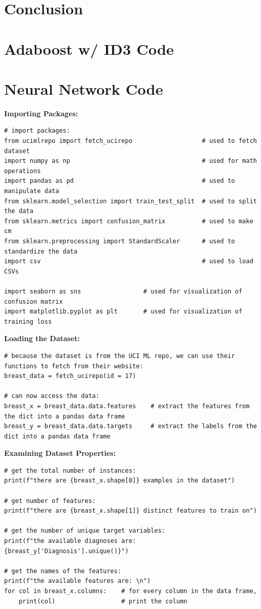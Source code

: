 \documentclass[a4paper]{article}
\begin{document}
\newpage
\section{Conclusion}

\newpage



\renewcommand{\thesection}{Appendix \Alph{section}: \hspace{-4mm}}
\setcounter{section}{0} %

\newpage
\section{Adaboost w/ ID3 Code}

\newpage
\section{Neural Network Code}
\textbf{Importing Packages:}
\begin{lstlisting}
# import packages:
from ucimlrepo import fetch_ucirepo                   # used to fetch dataset
import numpy as np                                    # used for math operations
import pandas as pd                                   # used to manipulate data
from sklearn.model_selection import train_test_split  # used to split the data
from sklearn.metrics import confusion_matrix          # used to make cm
from sklearn.preprocessing import StandardScaler      # used to standardize the data
import csv                                            # used to load CSVs

import seaborn as sns                 # used for visualization of confusion matrix
import matplotlib.pyplot as plt       # used for visualization of training loss
\end{lstlisting} 

\textbf{Loading the Dataset:}
\begin{lstlisting}
# because the dataset is from the UCI ML repo, we can use their functions to fetch from their website:
breast_data = fetch_ucirepo(id = 17)

# can now access the data:
breast_x = breast_data.data.features    # extract the features from the dict into a pandas data frame
breast_y = breast_data.data.targets     # extract the labels from the dict into a pandas data frame
\end{lstlisting}

\textbf{Examining Dataset Properties:}
\begin{lstlisting}
# get the total number of instances:
print(f"there are {breast_x.shape[0]} examples in the dataset")

# get number of features:
print(f"there are {breast_x.shape[1]} distinct features to train on")

# get the number of unique target variables:
print(f"the available diagnoses are: {breast_y['Diagnosis'].unique()}")

# get the names of the features:
print(f"the available features are: \n")
for col in breast_x.columns:    # for every column in the data frame, 
    print(col)                  # print the column    
\end{lstlisting}
\end{document}
